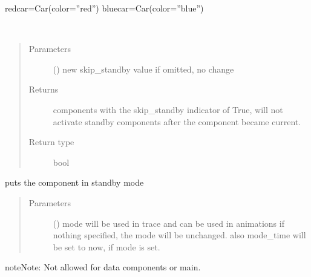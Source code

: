 \documentclass[letterpaper,10pt,english]{sphinxmanual}
\begin{document}
\begin{fulllineitems}
\begin{fulllineitems}
\begin{description}
\end{description}

redcar=Car(color=”red”) 
bluecar=Car(color=”blue”)

\end{fulllineitems}


\begin{fulllineitems}
\label{\detokenize{Reference:salabim.Component.skip_standby}}~\begin{quote}\begin{description}
\item[{Parameters}] \leavevmode
{} () \textendash{} new skip\_standby value 
if omitted, no change

\item[{Returns}] \leavevmode
{} \textendash{} components with the skip\_standby indicator of True, will not activate standby components after
the component became current.

\item[{Return type}] \leavevmode
bool

\end{description}\end{quote}

\end{fulllineitems}


\begin{fulllineitems}
\label{\detokenize{Reference:salabim.Component.standby}}
puts the component in standby mode
\begin{quote}\begin{description}
\item[{Parameters}] \leavevmode
{} () \textendash{} mode 
will be used in trace and can be used in animations 
if nothing specified, the mode will be unchanged. 
also mode\_time will be set to now, if mode is set.

\end{description}\end{quote}

\begin{sphinxadmonition}{note}{Note:}
Not allowed for data components or main.


\end{sphinxadmonition}
\end{fulllineitems}
\end{fulllineitems}
\end{document}
